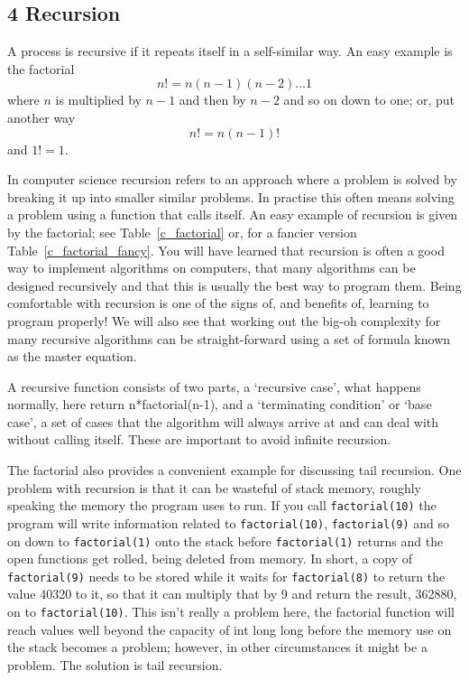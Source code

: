 \documentclass[11pt,a4paper]{scrartcl}
\begin{document}
\subsection*{4 Recursion}

A process is recursive if it repeats itself in a self-similar way. An
easy example is the factorial
\begin{equation}
n!=n(n-1)(n-2)\ldots 1
\end{equation}
where $n$ is multiplied by $n-1$ and then by $n-2$ and so on down to one; or, put another way
\begin{equation}
n!=n(n-1)!
\end{equation}
and $1!=1$.

In computer science recursion refers to an approach where a problem is
solved by breaking it up into smaller similar problems. In practise
this often means solving a problem using a function that calls
itself. An easy example of recursion is given by the factorial; see
Table~\ref{c_factorial} or, for a fancier version
Table~\ref{c_factorial_fancy}. You will have learned that recursion is
often a good way to implement algorithms on computers, that many
algorithms can be designed recursively and that this is usually the
best way to program them. Being comfortable with recursion is one of
the signs of, and benefits of, learning to program properly! We will
also see that working out the big-oh complexity for many recursive
algorithms can be straight-forward using a set of formula known as
the master equation.

A recursive function consists of two parts, a \lq{}recursive
case\rq{}, what happens normally, here return n*factorial(n-1), and a
\lq{}terminating condition\rq{} or \lq{}base case\rq{}, a set of cases
that the algorithm will always arrive at and can deal with without
calling itself. These are important to avoid infinite recursion.

The factorial also provides a convenient example for discussing tail
recursion. One problem with recursion is that it can be wasteful of
stack memory, roughly speaking the memory the program uses to run. If
you call \texttt{factorial(10)} the program will write information
related to \texttt{factorial(10)}, \texttt{factorial(9)} and so on
down to \texttt{factorial(1)} onto the stack before
\texttt{factorial(1)} returns and the open functions get rolled, being
deleted from memory. In short, a copy of \texttt{factorial(9)} needs
to be stored while it waits for \texttt{factorial(8)} to return the
value 40320 to it, so that it can multiply that by 9 and return the
result, 362880, on to \texttt{factorial(10)}. This isn't really a
problem here, the factorial function will reach values well beyond the
capacity of int long long before the memory use on the stack becomes a
problem; however, in other circumstances it might be a problem. The
solution is tail recursion.
\end{document}
